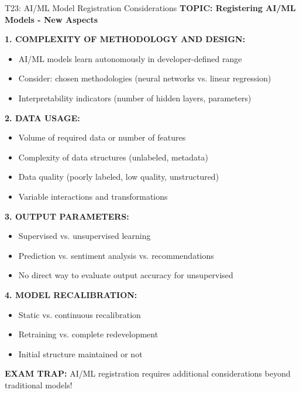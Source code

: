 \documentclass[8pt]{beamer}
\begin{document}
	\begin{frame}{T23: AI/ML Model Registration Considerations}
		\fontsize{6.5}{7.5}\selectfont
		\textbf{TOPIC: Registering AI/ML Models - New Aspects}
		
		\vspace{0.1cm}
		\textbf{1. COMPLEXITY OF METHODOLOGY AND DESIGN:}
		\begin{itemize}
			\item AI/ML models learn autonomously in developer-defined range
			\item Consider: chosen methodologies (neural networks vs. linear regression)
			\item Interpretability indicators (number of hidden layers, parameters)
		\end{itemize}
		
		\vspace{0.1cm}
		\textbf{2. DATA USAGE:}
		\begin{itemize}
			\item Volume of required data or number of features
			\item Complexity of data structures (unlabeled, metadata)
			\item Data quality (poorly labeled, low quality, unstructured)
			\item Variable interactions and transformations
		\end{itemize}
		
		\vspace{0.1cm}
		\textbf{3. OUTPUT PARAMETERS:}
		\begin{itemize}
			\item Supervised vs. unsupervised learning
			\item Prediction vs. sentiment analysis vs. recommendations
			\item No direct way to evaluate output accuracy for unsupervised
		\end{itemize}
		
		\vspace{0.1cm}
		\textbf{4. MODEL RECALIBRATION:}
		\begin{itemize}
			\item Static vs. continuous recalibration
			\item Retraining vs. complete redevelopment
			\item Initial structure maintained or not
		\end{itemize}
		
		\textcolor{myred}{\textbf{EXAM TRAP:}} AI/ML registration requires \textcolor{myblue}{additional considerations beyond traditional models}!
	\end{frame}
	
\end{document}
